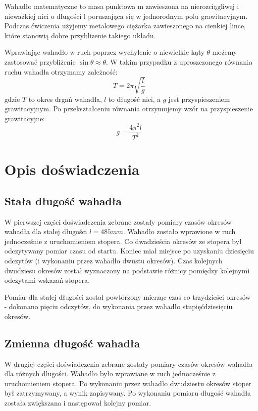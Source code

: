 \documentclass[a4paper,10pt,twoside]{article}
\begin{document}
Wahadło matematyczne to masa punktowa m zawieszona na nierozciągliwej i nieważkiej nici o długości l poruszająca się w jednorodnym polu grawitacyjnym. Podczas ćwiczenia użyjemy metalowego ciężarka zawieszonego na cienkiej lince, które stanowią dobre przyblizenie takiego układu.

Wprawiając wahadło w ruch poprzez wychylenie o niewielkie kąty $\theta$ możemy zastosować przybliżenie $\sin\theta\approx\theta$. W takim przypadku z uproszczonego równania ruchu wahadła otrzymamy zależność: $$T = 2\pi\sqrt{\frac{l}{g}}$$gdzie $T$ to okres drgań wahadła, $l$ to długość nici, a $g$ jest przyspieszeniem grawitacyjnym. Po przekształceniu równania otrzymujemy wzór na przyspieszenie grawitacyjne: $$g = \frac{4\pi^2l}{T^2}$$

\section{Opis doświadczenia}

\subsection{Stała długość wahadła}

W pierwszej części doświadczenia zebrane zostały pomiary czasów okresów wahadła dla stałej długości $l = 485mm$. Wahadło zostało wprawione w ruch jednocześnie z uruchomieniem stopera. Co dwadzieścia okresów ze stopera był odczytywany pomiar czasu od startu. Koniec miał miejsce po uzyskaniu dziesięciu odczytów (i wykonaniu przez wahadło dwustu okresów). Czas kolejnych dwudziesu okresów został wyznaczony na podstawie różnicy pomiędzy kolejnymi odczytami wskazań stopera.

Pomiar dla stałej długości został powtórzony mierząc czas co trzydzieści okresów - dokonano pięciu odczytów, do wykonania przez wahadło stupięćdziesięciu okresów.

\subsection{Zmienna długość wahadła}

W drugiej części doświadczenia zebrane zostały pomiary czasów okresów wahadła dla różnych długości. Wahadło było wprawiane w ruch jednocześnie z uruchomieniem stopera. Po wykonaniu przez wahadło dwudziestu okresów stoper był zatrzymywany, a wynik zapisywany. Po wykonaniu pomiaru długość wahadła została zwiększana i następował kolejny pomiar.
\end{document}
